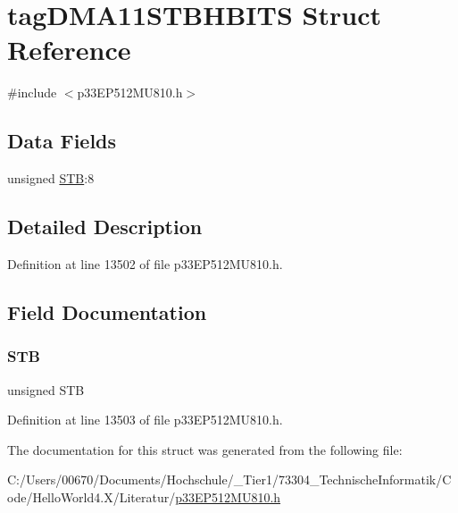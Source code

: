 \hypertarget{structtag_d_m_a11_s_t_b_h_b_i_t_s}{}\section{tag\+D\+M\+A11\+S\+T\+B\+H\+B\+I\+TS Struct Reference}
\label{structtag_d_m_a11_s_t_b_h_b_i_t_s}


{\ttfamily \#include $<$p33\+E\+P512\+M\+U810.\+h$>$}

\subsection*{Data Fields}
\begin{DoxyCompactItemize}
\item 
unsigned \hyperlink{structtag_d_m_a11_s_t_b_h_b_i_t_s_a9bd043a4db27e09b5035a563a8758fe7}{S\+TB}\+:8
\end{DoxyCompactItemize}


\subsection{Detailed Description}


Definition at line 13502 of file p33\+E\+P512\+M\+U810.\+h.



\subsection{Field Documentation}
\mbox{\label{structtag_d_m_a11_s_t_b_h_b_i_t_s_a9bd043a4db27e09b5035a563a8758fe7}} 
\subsubsection{\texorpdfstring{S\+TB}{STB}}
{\footnotesize\ttfamily unsigned S\+TB}



Definition at line 13503 of file p33\+E\+P512\+M\+U810.\+h.



The documentation for this struct was generated from the following file\+:\begin{DoxyCompactItemize}
\item 
C\+:/\+Users/00670/\+Documents/\+Hochschule/\+\_\+\+Tier1/73304\+\_\+\+Technische\+Informatik/\+Code/\+Hello\+World4.\+X/\+Literatur/\hyperlink{p33_e_p512_m_u810_8h}{p33\+E\+P512\+M\+U810.\+h}\end{DoxyCompactItemize}
